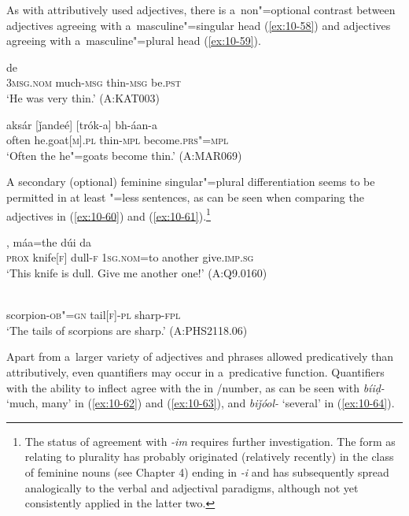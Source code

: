 As with attributively used adjectives, there is a~non"=optional  contrast between adjectives agreeing with a~masculine"=singular head (\ref{ex:10-58}) and adjectives agreeing with a~masculine"=plural head (\ref{ex:10-59}).

\begin{exe}
\ex
\label{ex:10-58}
 de \\
\textsc{3msg.nom} much-\textsc{msg} thin-\textsc{msg} be.\textsc{pst} \\
\glt `He was very thin.' (A:KAT003)

\ex
\label{ex:10-59}
\gll aksár [ǰandeé] [trók-a] bh-áan-a \\
often he.goat[\textsc{m}].\textsc{pl} thin-\textsc{mpl} become.\textsc{prs"=mpl} \\
\glt `Often the he"=goats become thin.' (A:MAR069)
\end{exe}


A secondary (optional) feminine singular"=plural  differentiation seems to be permitted in at least "=less sentences, as can be seen when comparing the adjectives in (\ref{ex:10-60}) and (\ref{ex:10-61}).\footnote{The status of agreement with \textit{-im} requires further investigation. The form as relating to plurality has probably originated (relatively recently) in the class of feminine nouns (see Chapter 4) ending in \textit{-i} and has subsequently spread analogically to the verbal and adjectival paradigms, although not yet consistently applied in the latter two.}

\begin{exe}
\ex
\label{ex:10-60}
, máa=the dúi da \\
\textsc{prox} knife[\textsc{f}] dull-\textsc{f} \textsc{1sg.nom=}to another give.\textsc{imp.sg} \\
\glt `This knife is dull. Give me another one!' (A:Q9.0160)

\ex
\label{ex:10-61}
\gll [ṭíinčuk"=am-i laméeṭi-m] [tíiṇ-im] \\ 
scorpion-\textsc{ob"=gn} tail[\textsc{f}]-\textsc{pl } sharp-\textsc{fpl} \\
\glt `The tails of scorpions are sharp.' (A:PHS2118.06)
\end{exe}

Apart from a~larger variety of adjectives and  phrases allowed predicatively than attributively, even quantifiers may occur in a~predicative function. Quantifiers with the ability to inflect agree with the    in /number, as can be seen with \textit{bíiḍ-} `much, many' in (\ref{ex:10-62}) and (\ref{ex:10-63}), and \textit{biǰóol-} `several' in (\ref{ex:10-64}).

